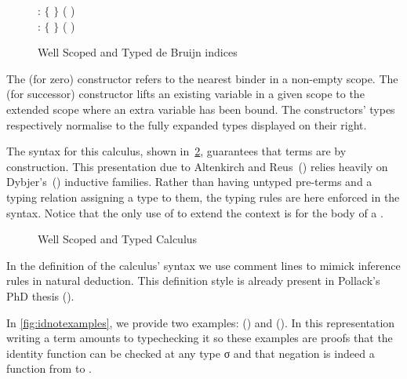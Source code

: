 \begin{figure}[h]
\begin{minipage}{0.5\textwidth}
\end{minipage}
\begin{minipage}{0.5\textwidth}
  \vspace*{\baselineskip}
   : { $\lbrace$ $\rbrace$ 
              ( \AIC{::} )}
  \\
   : { $\lbrace$  $\rbrace$ 
                  ( \AIC{::} )}
\end{minipage}
\caption{Well Scoped and Typed de Bruijn indices\label{fig:variable}}
\end{figure}

The  (for zero) constructor refers to the nearest binder in a
non-empty scope. The  (for successor) constructor lifts an
existing variable in a given scope to the extended scope where an
extra variable has been bound. The constructors' types respectively
normalise to the fully expanded types displayed on their right.

The syntax for this calculus, shown in~\cref{fig:term}, guarantees that
terms are \scopeandtypesafe{} by construction. This presentation due to
Altenkirch and Reus~(\citeyear{altenkirch1999monadic}) relies heavily on
Dybjer's~(\citeyear{dybjer1991inductive}) inductive families. Rather than
having untyped pre-terms and a typing relation assigning a type to
them, the typing rules are here enforced in the syntax. Notice that
the only use of  to extend the context is for the body of
a .

\begin{figure}[h]
\caption{Well Scoped and Typed Calculus\label{fig:term}}
\end{figure}

\begin{convention}
In the definition of the calculus' syntax we use comment lines to mimick
inference rules in natural deduction. This definition style is already
present in Pollack's PhD thesis (\citeyear{pollack1994}).
\end{convention}

In \cref{fig:idnotexamples}, we provide two examples: {()}
and {()}.
%
In this representation writing a term amounts to typechecking it so
these examples are proofs that the identity function can be checked
at any type σ and that negation is indeed a function from \bool{} to
\bool.

